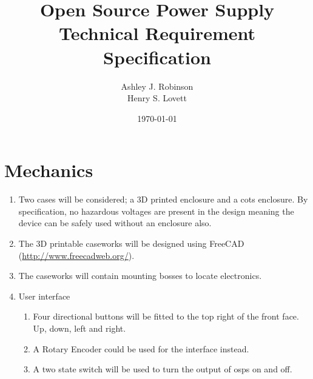 \documentclass[12pt,a4paper]{article}
\title{Open Source Power Supply\\ Technical Requirement Specification}
\author{Ashley J. Robinson \\ Henry S. Lovett}
\date{\today}
\begin{document}
\maketitle



\section{Mechanics}
\begin{enumerate}[label*=\arabic*.]
\item Two cases will be considered; a 3D printed enclosure and a \gls{cots} enclosure. By specification, no hazardous voltages are present in the design meaning the device can be safely used without an enclosure also.
\item The 3D printable caseworks will be designed using FreeCAD (\url{http://www.freecadweb.org/}).
\item The caseworks will contain mounting bosses to locate electronics.
\item User interface
	\begin{enumerate}[label*=\arabic*.]
	\item Four directional buttons will be fitted to the top right of the front face. Up, down, left and right.
	\item A Rotary Encoder could be used for the interface instead. 
	\item A two state switch will be used to turn the output of \gls{osps} on and off.
	\end{enumerate}
\end{enumerate}
\end{document}
